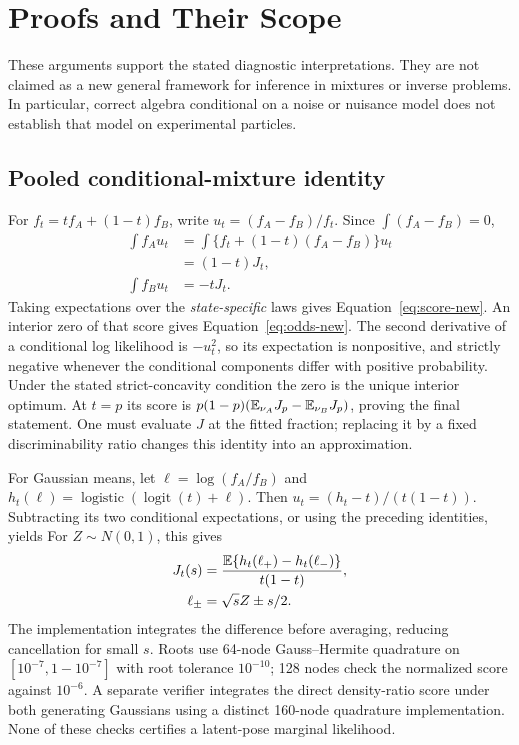 \section{Proofs and Their Scope}\label{app:proofs-new}
These arguments support the stated diagnostic interpretations. They are not
claimed as a new general framework for inference in mixtures or inverse
problems. In particular, correct algebra conditional on a noise or nuisance
model does not establish that model on experimental particles.

\subsection{Pooled conditional-mixture identity}
For $f_t=t f_A+(1-t)f_B$, write
$u_t=(f_A-f_B)/f_t$. Since $\int(f_A-f_B)=0$,
\begin{align}
\int f_Au_t&=\int\{f_t+(1-t)(f_A-f_B)\}u_t\\
&=(1-t)J_t,\nonumber\\
\int f_Bu_t&=-tJ_t.
\end{align}
Taking expectations over the \emph{state-specific} laws gives
Equation~\eqref{eq:score-new}. An interior zero of that score gives
Equation~\eqref{eq:odds-new}. The second derivative of a conditional
log likelihood is $-u_t^2$, so its expectation is nonpositive, and strictly
negative whenever the conditional components differ with positive probability.
Under the stated strict-concavity condition the zero is the unique interior
optimum. At $t=p$ its score is
$p(1-p)(\mathbb E_{\nu_A}J_p-\mathbb E_{\nu_B}J_p)$, proving the final statement.
One must evaluate $J$ at the fitted fraction; replacing it by a fixed
discriminability ratio changes this identity into an approximation.

For Gaussian means, let $\ell=\log(f_A/f_B)$ and
$h_t(\ell)=\operatorname{logistic}(\operatorname{logit}(t)+\ell)$.
Then $u_t=(h_t-t)/(t(1-t))$. Subtracting its two conditional expectations,
or using the preceding identities, yields
For $Z\sim N(0,1)$, this gives
\begin{align}\label{eq:gauss-J-new}
J_t(s)&=\frac{\mathbb E\{h_t(\ell_+)-h_t(\ell_-)\}}{t(1-t)},\\
\ell_\pm&=\sqrt{s}Z\pm s/2.\nonumber
\end{align}
The implementation integrates the difference before averaging, reducing
cancellation for small $s$. Roots use 64-node Gauss--Hermite quadrature on
$[10^{-7},1-10^{-7}]$ with root tolerance $10^{-10}$; 128 nodes check the
normalized score against $10^{-6}$. A separate verifier integrates the
direct density-ratio score under both generating Gaussians using a distinct
160-node quadrature implementation. None of these checks certifies a
latent-pose marginal likelihood.

